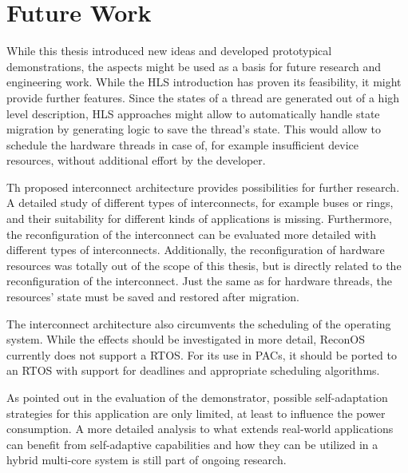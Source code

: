 \section{Future Work}
While this thesis introduced new ideas and developed prototypical
demonstrations, the aspects might be used as a basis for future research and
engineering work. While the \ac{HLS} introduction has proven its feasibility,
it might provide further features. Since the states of a thread are generated
out of a high level description, \ac{HLS} approaches might allow to
automatically handle state migration by generating logic to save the thread's
state. This would allow to schedule the hardware threads in case of, for
example insufficient device resources, without additional effort by the
developer.

Th proposed interconnect architecture provides possibilities for further
research. A detailed study of different types of interconnects, for example
buses or rings, and their suitability for different kinds of applications is
missing. Furthermore, the reconfiguration of the interconnect can be
evaluated more detailed with different types of interconnects. Additionally,
the reconfiguration of hardware resources was totally out of the scope of this
thesis, but is directly related to the reconfiguration of the interconnect.
Just the same as for hardware threads, the resources' state must be saved and
restored after migration.

The interconnect architecture also circumvents the scheduling of the operating
system. While the effects should be investigated in more detail, ReconOS
currently does not support a \ac{RTOS}. For its use in \acp{PAC}, it should be
ported to an \ac{RTOS} with support for deadlines and appropriate scheduling
algorithms.

As pointed out in the evaluation of the demonstrator, possible self-adaptation
strategies for this application are only limited, at least to influence the
power consumption. A more detailed analysis to what extends real-world
applications can benefit from self-adaptive capabilities and how they can be
utilized in a hybrid multi-core system is still part of ongoing research.